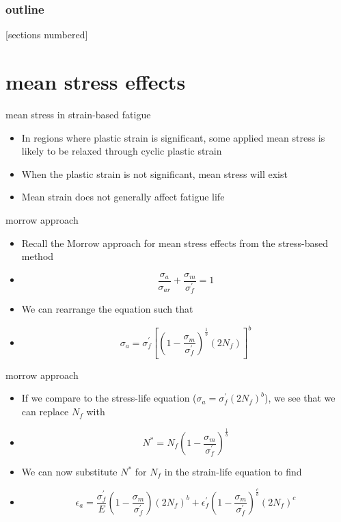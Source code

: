 \documentclass[10pt]{beamer}
\begin{document}
\begin{frame}
  \frametitle{outline}
  [sections numbered]
  \tableofcontents[hideallsubsections]
\end{frame}

\section{mean stress effects}
\begin{frame}{mean stress in strain-based fatigue}
	\begin{itemize}[<+->]
		\item In regions where plastic strain is significant, some applied mean stress is likely to be relaxed through cyclic plastic strain
		\item When the plastic strain is not significant, mean stress will exist
		\item Mean strain does not generally affect fatigue life
	\end{itemize}
\end{frame}

\begin{frame}{morrow approach}
	\begin{itemize}[<+->]
		\item Recall the Morrow approach for mean stress effects from the stress-based method
		\item[]\begin{equation}
		\frac{\sigma_a}{\sigma_{ar}} + \frac{\sigma_m}{\sigma_f^\prime} = 1
		\end{equation}
		\item We can rearrange the equation such that
		\item[]\begin{equation}
		\sigma_a = \sigma_f^\prime\left[\left(1-\frac{\sigma_m}{\sigma_f^\prime}\right)^\frac{1}{b}(2N_f)\right]^b
		\end{equation}
	\end{itemize}
\end{frame}

\begin{frame}{morrow approach}
	\begin{itemize}[<+->]
		\item If we compare to the stress-life equation ($\sigma_a = \sigma_f^\prime(2N_f)^b$), we see that we can replace $N_f$ with
		\item[] \begin{equation}
		\label{eq:nstar}
		N^* = N_f \left(1-\frac{\sigma_m}{\sigma_f^\prime}\right)^\frac{1}{b}
		\end{equation}
		\item We can now substitute $N^*$ for $N_f$ in the strain-life equation to find
		\item[] \begin{equation}
		\epsilon_a = \frac{\sigma_f^\prime}{E} \left(1-\frac{\sigma_m}{\sigma_f^\prime}\right)(2N_f)^b + \epsilon_f^\prime\left(1-\frac{\sigma_m}{\sigma_f^\prime}\right)^\frac{c}{b} (2 N_f)^c
		\end{equation}
	\end{itemize}
\end{frame}
\end{document}
